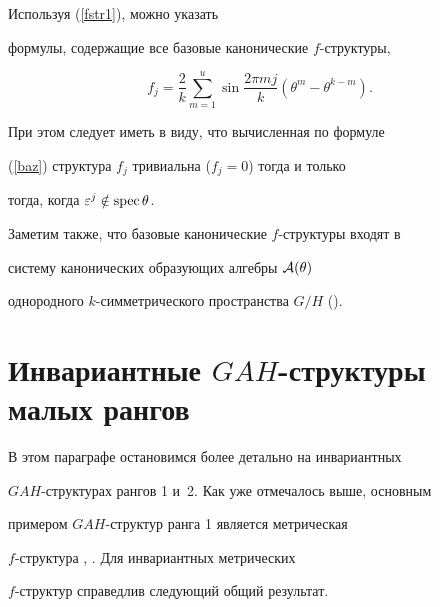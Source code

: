 \begin{note}


Используя (\ref{fstr1}), можно указать


формулы, содержащие все базовые канонические $f$-структуры,


\begin{equation}\label{baz}


f_j=\frac2k\sum_{m=1}^u\sin{\frac{2\pi m


j}{k}}(\theta^m-\theta^{k-m}).


\end{equation}


При этом следует иметь в виду, что вычисленная по формуле


(\ref{baz}) структура $f_j$ тривиальна ($f_j=0$) тогда и только


тогда, когда  $\varepsilon^j\notin \operatorname{spec}\theta$.





Заметим также, что базовые канонические $f$-структуры входят в


систему канонических образующих алгебры $\cal{A}(\theta)$


однородного $k$-симметрического пространства $G/H$ (\cite{29}).


\end{note}








\section{Инвариантные $GAH$-структуры малых рангов}





В этом параграфе остановимся более детально на инвариантных


$GAH$-структурах рангов 1 и~2. Как уже отмечалось выше, основным


примером $GAH$-структур ранга 1 является метрическая


$f$-структура \cite{3}, \cite{4}. Для инвариантных метрических


$f$-структур справедлив следующий общий результат.





